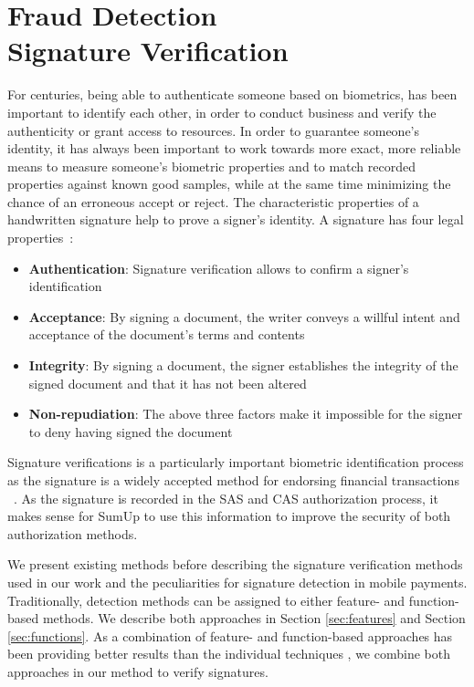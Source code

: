\documentclass[a4paper, oneside]{csthesis}
\begin{document}

\chapter{Fraud Detection \\Signature Verification}
\label{chp:signature-verification}

For centuries, being able to authenticate someone based on biometrics, has been important to identify each other, in order to conduct business and verify the authenticity or grant access to resources. In order to guarantee someone's identity, it has always been important to work towards more exact, more reliable means to measure someone's biometric properties and to match recorded properties against known good samples, while at the same time minimizing the chance of an erroneous accept or reject. The characteristic properties of a handwritten signature help to prove a signer's identity. A signature has four legal properties~\cite{Hanmandlu05}:

\begin{itemize}
\item \textbf{Authentication}: Signature verification allows to confirm a signer's identification
\item \textbf{Acceptance}: By signing a document, the writer conveys a willful intent and acceptance of the document's terms and contents
\item \textbf{Integrity}: By signing a document, the signer establishes the integrity of the signed document and that it has not been altered
\item \textbf{Non-repudiation}: The above three factors make it impossible for the signer to deny having signed the document
\end{itemize}

Signature verifications is a particularly important biometric identification process as the signature is a widely accepted method for endorsing financial transactions ~\cite{1227706}.
As the signature is recorded in the SAS and CAS authorization process, it makes sense for SumUp to use this information to improve the security of both authorization methods.

We present existing methods before describing the signature verification methods used in our work and the peculiarities for signature detection in mobile payments.
Traditionally, detection methods can be assigned to either feature- and function-based methods. We describe both approaches in Section \ref{sec:features} and Section \ref{sec:functions}. As a combination of feature- and function-based approaches has been providing better results than the individual techniques \cite{fierrez2005line}, we combine both approaches in our method to verify signatures.
\end{document}
